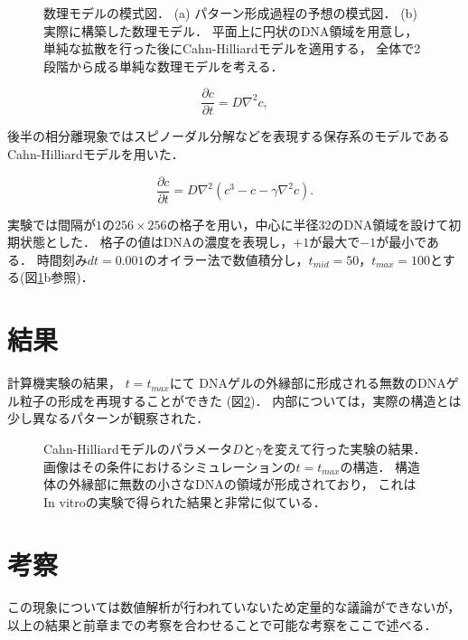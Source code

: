 \begin{figure}
\centering

\caption{
    数理モデルの模式図．
    (a) パターン形成過程の予想の模式図．
    (b) 実際に構築した数理モデル．
        平面上に円状のDNA領域を用意し，
        単純な拡散を行った後にCahn-Hilliardモデルを適用する，
        全体で2段階から成る単純な数理モデルを考える．
}
\label{fig:model_cahn_hilliard}
\end{figure}

\begin{equation}
\frac{\partial c}{\partial t}
=
D \nabla^{2} c
,
\end{equation}

後半の相分離現象ではスピノーダル分解などを表現する保存系のモデルであるCahn-Hilliardモデルを用いた．

\begin{equation}
\frac{\partial c}{\partial t}
=
D \nabla^{2} \left( c^3 - c - \gamma \nabla^{2} c \right)
.
\end{equation}

実験では間隔が$1$の$256\times 256$の格子を用い，中心に半径32のDNA領域を設けて初期状態とした．
格子の値はDNAの濃度を表現し，$+1$が最大で$-1$が最小である．
時間刻み$dt=0.001$のオイラー法で数値積分し，$t_{mid}=50$，$t_{max}=100$とする(図\ref{fig:model_cahn_hilliard}b参照)．

\section{結果}

計算機実験の結果，
$t=t_{max}$にて
DNAゲルの外縁部に形成される無数のDNAゲル粒子の形成を再現することができた
(図\ref{fig:result_cahn_hilliard})．
内部については，実際の構造とは少し異なるパターンが観察された．

\begin{figure}
\centering

\caption{
    Cahn-Hilliardモデルのパラメータ$D$と$\gamma$を変えて行った実験の結果．
    画像はその条件におけるシミュレーションの$t=t_{max}$の構造．
    構造体の外縁部に無数の小さなDNAの領域が形成されており，
    これはIn vitroの実験で得られた結果と非常に似ている．
}
\label{fig:result_cahn_hilliard}
\end{figure}


\section{考察}
この現象については数値解析が行われていないため定量的な議論ができないが，
以上の結果と前章までの考察を合わせることで可能な考察をここで述べる．

